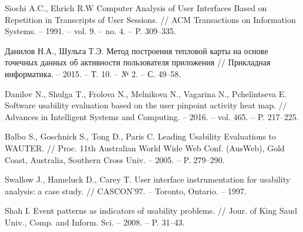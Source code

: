 
\begin{thebibliography}{1}
	Siochi A.C., Ehrich R.W
	Computer Analysis of User Interfaces Based on Repetition in Transcripts of User Sessions.
	// ACM Transactions on Information Systems. -- 1991. -- vol. 9. -- no. 4. -- P. 309–335.
	
	Данилов Н.А., Шульга Т.Э.
	Метод построения тепловой карты на основе точечных данных об активности пользователя приложения
	// Прикладная информатика. -- 2015. -- Т. 10. -- № 2. -- С. 49–58.
	
	Danilov N., Shulga T., Frolova N., Melnikova N., Vagarina N., Pchelintseva E.
	Software usability evaluation based on the user pinpoint activity heat map.
	// Advances in Intelligent Systems and Computing. -- 2016. -- vol. 465. -- P. 217–225.
	
	Balbo S., Goschnick S., Tong D., Paris C.
	Leading Usability Evaluations to WAUTER.
	// Proc. 11th Australian World Wide Web Conf. (AusWeb), Gold Coast, Australia, Southern Cross Univ. -- 2005. -- P. 279–290.
	
	Swallow J., Hameluck D., Carey T.
	User interface	instrumentation for usability analysis: a case study.
	// CASCON’97. -- Toronto, Ontario. -- 1997.
	
	Shah I.
	Event patterns as indicators of usability problems.
	// Jour. of King Saud Univ., Comp. and Inform. Sci. -- 2008. -- P. 31–43.
	

\end{thebibliography}
